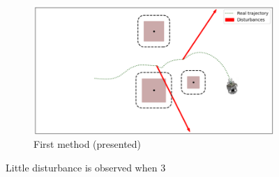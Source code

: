 \documentclass[conference]{IEEEtran}
\begin{document}
\begin{figure}
\centering
\begin{subfigure}{1\columnwidth}
\centerline{\includegraphics[width=\textwidth]{figures/first_meth.png}}
  \caption{First method (presented)}
\end{subfigure}
\caption{Little disturbance is observed when 3}
\label{fig_all_3_meth}
\end{figure}




\renewcommand*{\bibfont}{\footnotesize}
\printbibliography
\end{document}
